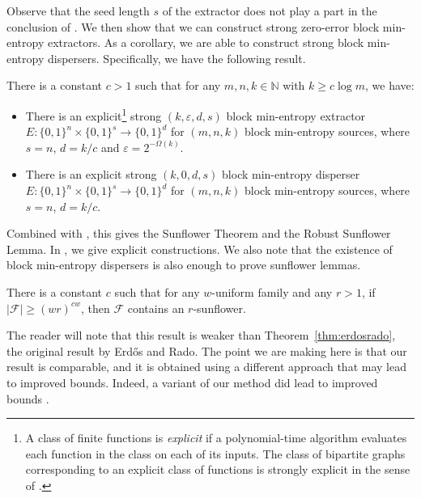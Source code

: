 \documentclass{toc}
\newcommand{\nnn}{\mathbb{N}}   %
\newcommand{\eps}{\varepsilon}
\newcommand{\calF}{\mathcal{F}} %
\begin{document}
Observe that the seed length $s$ of the extractor does not play a part in the conclusion of . We then show that we can
construct strong zero-error block min-entropy extractors. As a corollary, we are able to construct strong block min-entropy dispersers. Specifically, we have the following %
result.   %

\begin{theorem}\label{thm:extractor}
There is a constant $c>1$ such that for any $m, n, k \in \nnn$ with $k \geq c \log m$, we have:
\begin{itemize}
%
%
\item There is an explicit\footnote{\label{footnote:expl}
A class of finite functions is
\emph{explicit} if a polynomial-time algorithm evaluates
each function in the class on each of its inputs.
The class of bipartite graphs corresponding
to an explicit class of functions is strongly explicit in the sense
of .}
strong $(k,\eps,d,s)$ block min-entropy extractor $E:\{0,1\}^{n}\times\{0,1\}^{s}\rightarrow\{0,1\}^{d}$
for $(m, n, k)$ block min-entropy sources, where $s=n$, $d=k/c$ and $\eps=2^{-\Omega(k)}$.

\item There is an explicit strong $(k,0,d,s)$ block min-entropy disperser $E:\{0,1\}^{n}\times\{0,1\}^{s}\rightarrow\{0,1\}^{d}$ for $(m, n, k)$
block min-entropy sources, where $s=n$, $d=k/c$.
\end{itemize}
\end{theorem}

\noindent Combined with , this gives the Sunflower Theorem and the Robust Sunflower Lemma. In , we %
give  %
explicit constructions.  %
We also note that the existence of block min-entropy dispersers is
 also enough to prove sunflower lemmas.

\begin{corollary} \label{thm:sunflower}
There is a constant %
$c$   %
such that for any
%
$w$-uniform family  %
and any $r>1$, if $|\calF|\geq (wr)^{c w} $, then $\calF$
contains %
an   %
$r$-sunflower.
\end{corollary}

%
The reader will note that this result is weaker than
Theorem~\ref{thm:erdosrado}, the original result by Erd\H{o}s and Rado.
The point we are making here is that our result is comparable,
and it is obtained using a different approach that may lead to
improved bounds.  Indeed, a variant of our method did lead to
improved bounds \cite{alweiss2020improved, rao2020coding}.
%
%
%
\end{document}
